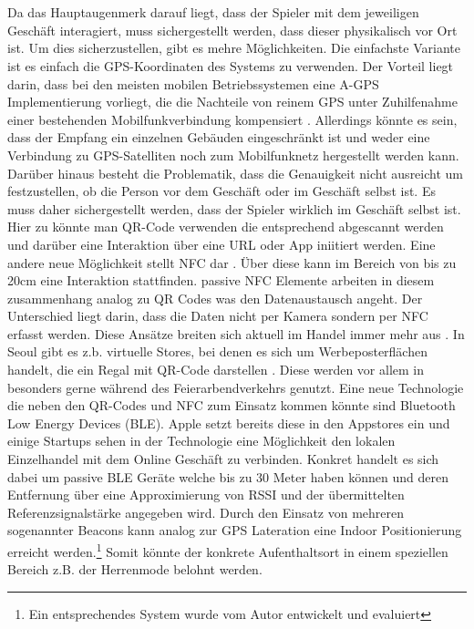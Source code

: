 \\\\
Da das Hauptaugenmerk darauf liegt, dass der Spieler mit dem jeweiligen Geschäft interagiert, muss sichergestellt werden, dass dieser physikalisch vor Ort ist. 
Um dies sicherzustellen, gibt es mehre Möglichkeiten. Die einfachste Variante ist es einfach die GPS-Koordinaten des Systems zu verwenden. Der Vorteil liegt darin, dass bei den meisten mobilen Betriebssystemen eine A-GPS Implementierung vorliegt, die die Nachteile von reinem GPS unter Zuhilfenahme einer bestehenden Mobilfunkverbindung kompensiert \cite{Djuknic.2001}. Allerdings könnte es sein, dass der Empfang ein einzelnen Gebäuden eingeschränkt ist und weder eine Verbindung zu GPS-Satelliten noch zum Mobilfunknetz hergestellt werden kann. Darüber hinaus besteht die Problematik, dass die Genauigkeit nicht ausreicht um festzustellen, ob die Person vor dem Geschäft oder im Geschäft selbst ist.
Es muss daher sichergestellt werden, dass der Spieler wirklich im Geschäft selbst ist.
Hier zu könnte man QR-Code verwenden die entsprechend abgescannt werden und darüber eine Interaktion über eine URL oder App iniitiert werden. Eine andere neue Möglichkeit stellt NFC dar \cite{Rashid.2006b}. Über diese kann im Bereich von bis zu 20cm eine Interaktion stattfinden. \cite{Coulton.2006} passive NFC Elemente arbeiten in diesem zusammenhang analog zu QR Codes was den Datenaustausch angeht. Der Unterschied liegt darin, dass die Daten nicht per Kamera sondern per NFC erfasst werden. Diese Ansätze breiten sich aktuell im Handel immer mehr aus \cite{Heinemann.2014}. In Seoul gibt es z.b. virtuelle Stores, bei denen es sich um Werbeposterflächen handelt, die ein Regal mit QR-Code darstellen \cite{Tesco.2012}. Diese werden vor allem in besonders gerne während des Feierarbendverkehrs genutzt.
Eine neue Technologie die neben den QR-Codes und NFC zum Einsatz kommen könnte sind Bluetooth Low Energy Devices (BLE). Apple setzt bereits diese in den Appstores ein und einige Startups sehen in der Technologie eine Möglichkeit den lokalen Einzelhandel mit dem Online Geschäft zu verbinden. Konkret handelt es sich dabei um passive BLE Geräte welche bis zu 30 Meter haben können und deren Entfernung über eine Approximierung von RSSI und der übermittelten Referenzsignalstärke angegeben wird. \cite{Do.2013} Durch den Einsatz von mehreren sogenannter Beacons kann analog zur GPS Lateration eine Indoor Positionierung erreicht werden.\footnote{Ein entsprechendes System wurde vom Autor entwickelt und evaluiert} Somit könnte der konkrete Aufenthaltsort in einem speziellen Bereich z.B. der Herrenmode belohnt werden.
